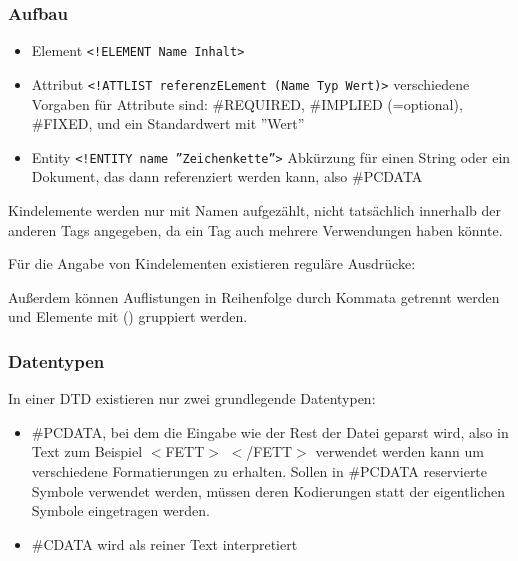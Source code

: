 \documentclass[12pt,a4]{article}
\begin{document}
\subsubsection{Aufbau}
\begin{itemize}
	\item Element \texttt{<!ELEMENT Name Inhalt>}
	\item Attribut \texttt{<!ATTLIST referenzELement (Name Typ Wert)>} verschiedene Vorgaben für Attribute sind: \#REQUIRED, \#IMPLIED (=optional), \#FIXED, und ein Standardwert mit ''Wert''
	\item Entity \texttt{<!ENTITY name ''Zeichenkette''>} Abkürzung für einen String oder ein Dokument, das dann referenziert werden kann, also \#PCDATA
	
\end{itemize}

 Kindelemente werden nur mit Namen aufgezählt, nicht tatsächlich innerhalb der anderen Tags angegeben, da ein Tag auch mehrere Verwendungen haben könnte.

 Für die Angabe von Kindelementen existieren reguläre Ausdrücke:

Außerdem können Auflistungen in Reihenfolge durch Kommata getrennt werden und Elemente mit () gruppiert werden.
\subsubsection{Datentypen}
In einer DTD existieren nur zwei grundlegende Datentypen:
\begin{itemize}
	\item \#PCDATA, bei dem die Eingabe wie der Rest der Datei geparst wird, also in Text zum Beispiel \(<\)FETT\(>\) \(<\)/FETT\(>\) verwendet werden kann um verschiedene Formatierungen zu erhalten. Sollen in \#PCDATA reservierte Symbole verwendet werden, müssen deren Kodierungen statt der eigentlichen Symbole eingetragen werden.
	\item \#CDATA wird als reiner Text interpretiert
\end{itemize}
 
 
\end{document}
